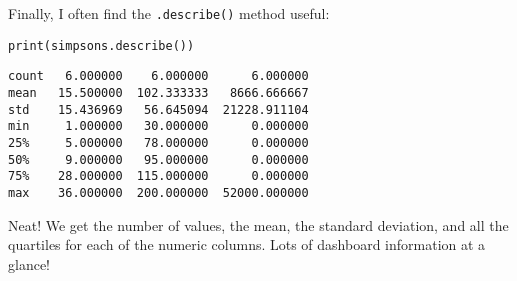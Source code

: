 Finally, I often find the \texttt{.describe()} method useful:

\begin{samepage}
\begin{Verbatim}[fontsize=\small,samepage=true,frame=single,framesep=3mm]
print(simpsons.describe())
\end{Verbatim}
\vspace{-.2in}

\begin{Verbatim}[fontsize=\small,samepage=true,frame=leftline,framesep=5mm,framerule=1mm]
count   6.000000    6.000000      6.000000
mean   15.500000  102.333333   8666.666667
std    15.436969   56.645094  21228.911104
min     1.000000   30.000000      0.000000
25%     5.000000   78.000000      0.000000
50%     9.000000   95.000000      0.000000
75%    28.000000  115.000000      0.000000
max    36.000000  200.000000  52000.000000
\end{Verbatim}
\end{samepage}


Neat! We get the number of values, the mean, the standard deviation, and all
the quartiles for each of the numeric columns. Lots of dashboard information at
a glance!

